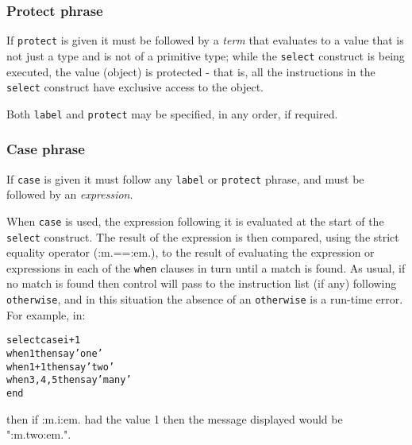 \subsubsection{Protect phrase}
 
If \texttt{protect} is given it must be followed by a \emph{term}
that evaluates to a value that is not just a type and is not of a
primitive type;
while the \texttt{select} construct is being executed, the value
(object) is protected - that is, all the instructions in the
\texttt{select} construct have exclusive access to the object.
 
Both \texttt{label} and \texttt{protect} may be specified, in any order,
if required.
\subsubsection{Case phrase}
 
If \texttt{case} is given it must follow any \texttt{label} or
\texttt{protect} phrase, and must be followed by an
\emph{expression}.
 
When \texttt{case} is used, the expression following it is evaluated at
the start of the \texttt{select} construct.
The result of the expression is then compared, using the strict equality
operator (:m.==:em.), to the result of evaluating the expression
or expressions in each of the \texttt{when} clauses in turn until
a match is found.  As usual, if no match is found then control
will pass to the instruction list (if any) following
\texttt{otherwise}, and in this situation the absence of an
\texttt{otherwise} is a run-time error.
 For example, in:
\begin{alltt}
select case i+1
  when 1 then say 'one'
  when 1+1 then say 'two'
  when 3, 4, 5 then say 'many'
end
\end{alltt}
then if :m.i:em. had the value 1 then the message displayed would be
":m.two:em.".
 
